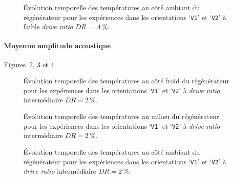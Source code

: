 \begin{figure}[!ht] %
    \centering
    
    \caption{\'Evolution temporelle des températures au côté ambiant du régénérateur pour les expériences dans les orientations `\texttt{V1}' et `\texttt{V2}' à faible \textit{drive ratio} $DR=\qty{.4}{\percent}$.}
    \label{fig:Acou_AHXin_V1V2_Low}
\end{figure}


\paragraph{Moyenne amplitude acoustique} Figures~\ref{fig:Acou_CHXin_V1V2_Mid}, \ref{fig:Acou_Regmid_V1V2_Mid} et \ref{fig:Acou_AHXin_V1V2_Mid}
\begin{figure}[!ht] %
    \centering
    
    \caption{\'Evolution temporelle des températures au côté froid du régénérateur pour les expériences dans les orientations `\texttt{V1}' et `\texttt{V2}' à \textit{drive ratio} intermédiaire $DR=\qty{2}{\percent}$.}
    \label{fig:Acou_CHXin_V1V2_Mid}
\end{figure}

\begin{figure}[!ht] %
    \centering
    
    \caption{\'Evolution temporelle des températures au milieu du régénérateur pour les expériences dans les orientations `\texttt{V1}' et `\texttt{V2}' à \textit{drive ratio} intermédiaire $DR=\qty{2}{\percent}$.}
    \label{fig:Acou_Regmid_V1V2_Mid}
\end{figure}

\begin{figure}[!ht] %
    \centering
    
    \caption{\'Evolution temporelle des températures au côté ambiant du régénérateur pour les expériences dans les orientations `\texttt{V1}' et `\texttt{V2}' à \textit{drive ratio} intermédiaire $DR=\qty{2}{\percent}$.}
    \label{fig:Acou_AHXin_V1V2_Mid}
\end{figure}

